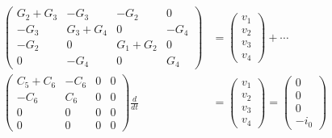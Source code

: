 \documentclass[%
oneside,                 %
final,                   %
10pt]{article}
\begin{document}
\begin{align*}
\begin{pmatrix}
G_2 + G_3 & -G_3 & -G_2 & 0 \\ 
-G_3 & G_3 + G_4 & 0 & -G_4 \\ 
-G_2 & 0 & G_1 + G_2 & 0 \\ 
0 & -G_4 & 0 & G_4
\end{pmatrix}
&=
\begin{pmatrix}
v_1 \\ 
v_2 \\ 
v_3 \\ 
v_4
\end{pmatrix}
+ \cdots \\ 
\begin{pmatrix}
C_5 + C_6 & -C_6 & 0 & 0 \\ 
-C_6 & C_6 & 0 & 0 \\ 
0 & 0 & 0 & 0 \\ 
0 & 0 & 0 & 0
\end{pmatrix}
\frac{d}{dt} &=
\begin{pmatrix}
v_1 \\ 
v_2 \\ 
v_3 \\ 
v_4
\end{pmatrix} =
\begin{pmatrix}
0 \\ 
0 \\ 
0 \\ 
-i_0
\end{pmatrix}
\end{align*}


\end{document}
